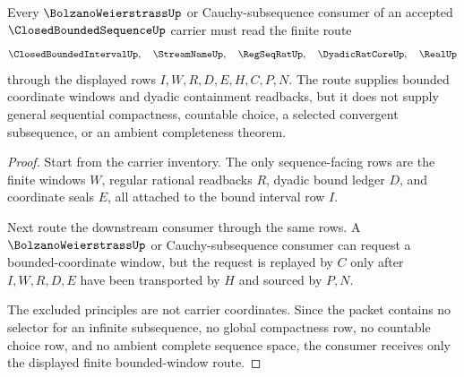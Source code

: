 \begin{theorem}
\label{thm:closed-bounded-sequence-cauchy-subsequence-window}
Every $\BolzanoWeierstrassUp$ or Cauchy-subsequence consumer of an accepted $\ClosedBoundedSequenceUp$ carrier must read the finite route
$$
\ClosedBoundedIntervalUp,\quad \StreamNameUp,\quad \RegSeqRatUp,\quad \DyadicRatCoreUp,\quad \RealUp
$$
through the displayed rows $I,W,R,D,E,H,C,P,N$. The route supplies bounded coordinate windows and dyadic containment readbacks, but it does not supply general sequential compactness, countable choice, a selected convergent subsequence, or an ambient completeness theorem.
\end{theorem}
\begin{proof}
Start from the carrier inventory. The only sequence-facing rows are the finite windows $W$, regular rational readbacks $R$, dyadic bound ledger $D$, and coordinate seals $E$, all attached to the bound interval row $I$.

Next route the downstream consumer through the same rows. A $\BolzanoWeierstrassUp$ or Cauchy-subsequence consumer can request a bounded-coordinate window, but the request is replayed by $C$ only after $I,W,R,D,E$ have been transported by $H$ and sourced by $P,N$.

The excluded principles are not carrier coordinates. Since the packet contains no selector for an infinite subsequence, no global compactness row, no countable choice row, and no ambient complete sequence space, the consumer receives only the displayed finite bounded-window route.
\end{proof}




